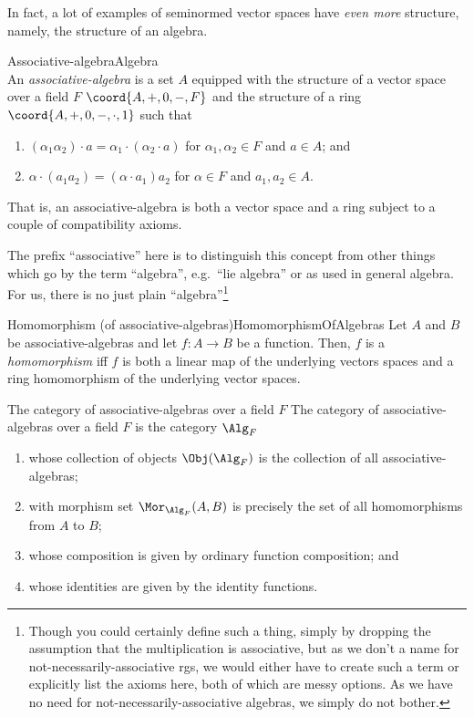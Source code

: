 In fact, a lot of examples of seminormed vector spaces have \emph{even more} structure, namely, the structure of an algebra.
\begin{dfn}{Associative-algebra}{Algebra}
\\
An \emph{associative-algebra} is a set $A$ equipped with the structure of a vector space over a field $F$ $\coord{A,+,0,-,F}$ and the structure of a ring $\coord{A,+,0,-,\cdot ,1}$ such that
\begin{enumerate}
\item $(\alpha _1\alpha _2)\cdot a=\alpha _1\cdot (\alpha _2\cdot a)$ for $\alpha _1,\alpha _2\in F$ and $a\in A$; and
\item $\alpha \cdot (a_1a_2)=(\alpha \cdot a_1)a_2$ for $\alpha \in F$ and $a_1,a_2\in A$.
\end{enumerate}
\begin{rmk}
That is, an associative-algebra is both a vector space and a ring subject to a couple of compatibility axioms.
\end{rmk}
\begin{rmk}
The prefix ``associative'' here is to distinguish this concept from other things which go by the term ``algebra'', e.g.~``lie algebra'' or as used in general algebra.  For us, there is no just plain ``algebra''\footnote{Though you could certainly define such a thing, simply by dropping the assumption that the multiplication is associative, but as we don't a name for not-necessarily-associative rgs, we would either have to create such a term or explicitly list the axioms here, both of which are messy options.  As we have no need for not-necessarily-associative algebras, we simply do not bother.}
\end{rmk}
\end{dfn}
\begin{dfn}{Homomorphism (of associative-algebras)}{HomomorphismOfAlgebras}
Let $A$ and $B$ be associative-algebras and let $f\colon A\rightarrow B$ be a function.  Then, $f$ is a \emph{homomorphism} iff $f$ is both a linear map of the underlying vectors spaces and a ring homomorphism of the underlying vector spaces.
\end{dfn}
\begin{exm}{The category of associative-algebras over a field $F$}{}
The category of associative-algebras over a field $F$ is the category $\Alg _F$
\begin{enumerate}
\item whose collection of objects $\Obj (\Alg _F )$ is the collection of all associative-algebras;
\item with morphism set $\Mor _{\Alg _F}(A,B)$ is precisely the set of all homomorphisms from $A$ to $B$;
\item whose composition is given by ordinary function composition; and
\item whose identities are given by the identity functions.
\end{enumerate}
\end{exm}
